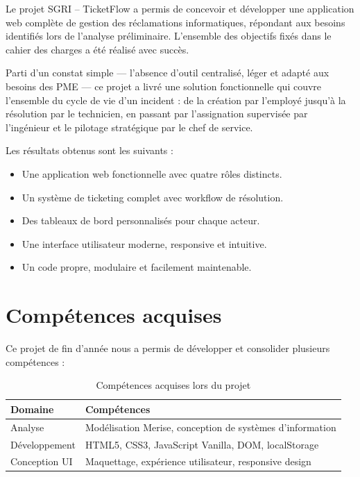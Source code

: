 \documentclass[12pt,a4paper,oneside]{report}
\renewcommand{\arraystretch}{1.3}
\begin{document}
Le projet SGRI -- TicketFlow a permis de concevoir et développer une application web complète de gestion des réclamations informatiques, répondant aux besoins identifiés lors de l'analyse préliminaire. L'ensemble des objectifs fixés dans le cahier des charges a été réalisé avec succès.

Parti d'un constat simple --- l'absence d'outil centralisé, léger et adapté aux besoins des PME --- ce projet a livré une solution fonctionnelle qui couvre l'ensemble du cycle de vie d'un incident : de la création par l'employé jusqu'à la résolution par le technicien, en passant par l'assignation supervisée par l'ingénieur et le pilotage stratégique par le chef de service.

Les résultats obtenus sont les suivants :
\begin{itemize}
    \item Une application web fonctionnelle avec quatre rôles distincts.
    \item Un système de ticketing complet avec workflow de résolution.
    \item Des tableaux de bord personnalisés pour chaque acteur.
    \item Une interface utilisateur moderne, responsive et intuitive.
    \item Un code propre, modulaire et facilement maintenable.
\end{itemize}

\section{Compétences acquises}

Ce projet de fin d'année nous a permis de développer et consolider plusieurs compétences :

\begin{table}[htbp]
    \centering
    \caption{Compétences acquises lors du projet}
    \label{tab:competences}
    \renewcommand{\arraystretch}{1.5}
    \begin{tabular}{p{4cm} p{9cm}}
        \toprule
        \textbf{Domaine} & \textbf{Compétences} \\
        \midrule
        Analyse & Modélisation Merise, conception de systèmes d'information \\
        Développement & HTML5, CSS3, JavaScript Vanilla, DOM, localStorage \\
        Conception UI & Maquettage, expérience utilisateur, responsive design \\
        \bottomrule
    \end{tabular}
\end{table}
\end{document}
